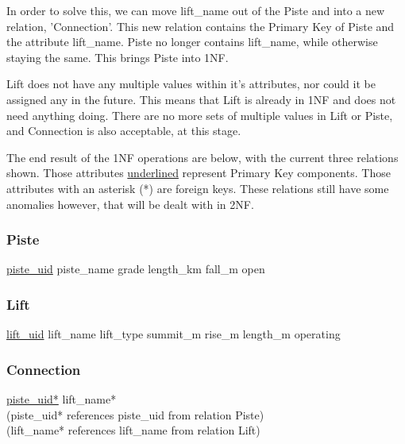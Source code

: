 \documentclass[11pt]{scrartcl} %
\begin{document}
In order to solve this, we can move lift\_name out of the Piste and into a new relation, 'Connection'. This new relation contains the Primary Key of Piste and the attribute lift\_name. Piste no longer contains lift\_name, while otherwise staying the same. This brings Piste into 1NF.

Lift does not have any multiple values within it's attributes, nor could it be assigned any in the future. This means that Lift is already in 1NF and does not need anything doing. There are no more sets of multiple values in Lift or Piste, and Connection is also acceptable, at this stage.

The end result of the 1NF operations are below, with the current three relations shown. Those attributes \underline{underlined} represent Primary Key components. Those attributes with an asterisk (*) are foreign keys. These relations still have some anomalies however, that will be dealt with in 2NF.

\subsubsection{Piste}
\underline{piste\_uid}\newline
piste\_name\newline
grade\newline
length\_km\newline
fall\_m\newline
open

\subsubsection{Lift}
\underline{lift\_uid}\newline
lift\_name\newline
lift\_type\newline
summit\_m\newline
rise\_m\newline
length\_m\newline
operating

\subsubsection{Connection}
\underline{piste\_uid*}\newline
lift\_name*\\[0.3cm]
(piste\_uid* references piste\_uid from relation Piste)\\
(lift\_name* references lift\_name from relation Lift)
\end{document}
